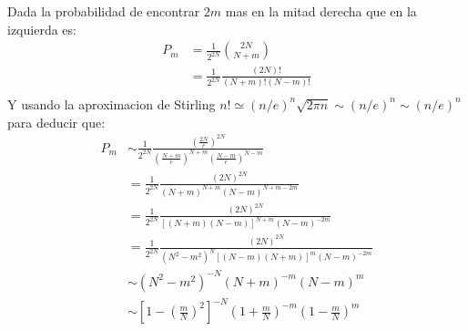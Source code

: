 \begin{answer}
    Dada la probabilidad de encontrar $2m$ mas en la mitad derecha que en la izquierda es:
    \begin{align*}
        P_m &=\frac{1}{2^{2 N}}{2 N \choose N+m}\\
        &=\frac{1}{2^{2 N}} \frac{(2 N) !}{(N+m) !(N-m) !}\\
    \end{align*}
    Y usando la aproximacion de Stirling $n ! \simeq(n / e)^n \sqrt{2 \pi n} \sim(n / e)^n \sim (n / e)^n$ para deducir que:
    \begin{align*}
        P_m &\sim \frac{1}{2^{2 N}} \frac{\left(\frac{2 N}{e}\right)^{2 N} }{\left(\frac{N+m}{e}\right)^{N+m} \left(\frac{N-m}{e}\right)^{N-m}}\\
        &= \frac{1}{2^{2 N}} \frac{\left(2 N\right)^{2 N}}{\left(N+m\right)^{N+m} \left(N-m\right)^{N+m - 2m}}\\
        &= \frac{1}{2^{2 N}} \frac{\left(2 N\right)^{2 N}}{\left[\left(N+m\right)\left(N-m\right)\right]^{N+m} \left(N-m\right)^{- 2m} }\\
        &= \frac{1}{2^{2 N}} \frac{\left(2 N\right)^{2 N}}{\left(N^2-m^2\right)^{N} \left[(N - m)(N+m)\right]^m \left(N-m\right)^{- 2m}}\\
        &\sim (N^2 - m^2)^{-N} (N + m)^{-m} (N - m)^m\\
        &\sim \left[1 - \left(\frac{m}{N}\right)^2\right]^{-N} \left(1 + \frac{m}{N}\right)^{-m} \left(1 - \frac{m}{N}\right)^m\\
    \end{align*}
\end{answer}